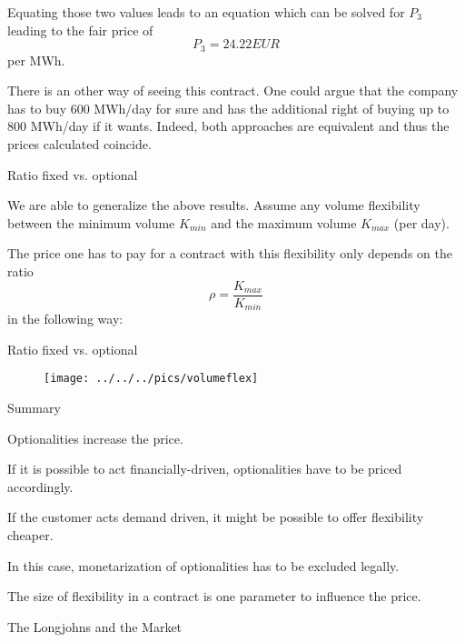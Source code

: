 	Equating those two values leads to an equation which can be solved for $P_3$ leading to the fair price of
$$
	P_3 = 24.22 EUR
$$
per MWh.


	
There is an other way of seeing this contract. One could argue that the company has to buy 600 MWh/day for sure and has the additional right of buying up to 800 MWh/day if it wants. Indeed, both approaches are equivalent and thus the prices calculated coincide.






{Ratio fixed vs. optional}






	We are able to generalize the above results. Assume any volume flexibility between the minimum volume $K_{min}$ and the maximum volume $K_{max}$ (per day).


	The price one has to pay for a contract with this flexibility only depends on the ratio
$$
	\rho = \frac{K_{max}}{K_{min}}
$$
in the following way:





{Ratio fixed vs. optional}
\begin{figure}
	\centering
		\texttt{[image: ../../../pics/volumeflex]}
	\label{fig:volumeflex}
\end{figure}

{Summary}






	Optionalities increase the price.


	If it is possible to act financially-driven, optionalities have to be priced accordingly.


	If the customer acts demand driven, it might be possible to offer flexibility cheaper.


	In this case, monetarization of optionalities has to be excluded legally.


	The size of flexibility in a contract is one parameter to influence the price.





{The Longjohns and the Market}

